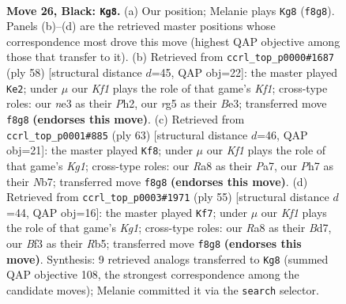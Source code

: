 \documentclass[11pt]{article}
\begin{document}
\clearpage

\begin{figure}[p]\centering
\begin{subfigure}{0.46\textwidth}\centering
\resizebox{\linewidth}{!}{%
\newchessgame
\chessboard[
  setfen={rn3k2/p4ppp/4p3/6R1/1P5P/4Nb2/P7/R1K5 b - - 0 26},
  showmover=false,
  pgfstyle=straightmove, color=movearrow, markmove={f8-g8}
]}
\caption{}
\end{subfigure}\hfill
\begin{subfigure}{0.46\textwidth}\centering
\resizebox{\linewidth}{!}{%
\newchessgame
\chessboard[
  setfen={1r4k1/5p2/7p/3p2pn/8/4B3/RP3PPP/5K2 w - - 0 30},
  showmover=false,
  pgfstyle=straightmove, color=movearrow, markmove={f1-e2}
]}
\caption{}
\end{subfigure}
\\[4pt]
\begin{subfigure}{0.46\textwidth}\centering
\resizebox{\linewidth}{!}{%
\newchessgame
\chessboard[
  setfen={6k1/pnr2pp1/1p5p/3RN3/P5PP/4P3/5PK1/8 b - - 2 32},
  showmover=false,
  pgfstyle=straightmove, color=movearrow, markmove={g8-f8}
]}
\caption{}
\end{subfigure}\hfill
\begin{subfigure}{0.46\textwidth}\centering
\resizebox{\linewidth}{!}{%
\newchessgame
\chessboard[
  setfen={6k1/p2b2pp/5p2/1r1p4/7P/P1B5/2P2PP1/2K1R3 b - - 0 28},
  showmover=false,
  pgfstyle=straightmove, color=movearrow, markmove={g8-f7}
]}
\caption{}
\end{subfigure}
\caption{\textbf{Move 26, Black: \texttt{Kg8}.} (a) Our position; Melanie plays \texttt{Kg8} (\texttt{f8g8}). Panels (b)--(d) are the retrieved master positions whose correspondence most drove this move (highest QAP objective among those that transfer to it). (b) Retrieved from \texttt{ccrl\_top\_p0000\#1687} (ply 58) [structural distance $d$=45, QAP obj=22]: the master played \texttt{Ke2}; under $\mu$ our \emph{Kf1} plays the role of that game's \emph{Kf1}; cross-type roles: our \emph{n}e3 as their \emph{P}h2, our \emph{r}g5 as their \emph{B}e3; transferred move \texttt{f8g8} \textbf{(endorses this move)}. (c) Retrieved from \texttt{ccrl\_top\_p0001\#885} (ply 63) [structural distance $d$=46, QAP obj=21]: the master played \texttt{Kf8}; under $\mu$ our \emph{Kf1} plays the role of that game's \emph{Kg1}; cross-type roles: our \emph{R}a8 as their \emph{P}a7, our \emph{P}h7 as their \emph{N}b7; transferred move \texttt{f8g8} \textbf{(endorses this move)}. (d) Retrieved from \texttt{ccrl\_top\_p0003\#1971} (ply 55) [structural distance $d$=44, QAP obj=16]: the master played \texttt{Kf7}; under $\mu$ our \emph{Kf1} plays the role of that game's \emph{Kg1}; cross-type roles: our \emph{R}a8 as their \emph{B}d7, our \emph{B}f3 as their \emph{R}b5; transferred move \texttt{f8g8} \textbf{(endorses this move)}. Synthesis: 9 retrieved analogs transferred to \texttt{Kg8} (summed QAP objective 108, the strongest correspondence among the candidate moves); Melanie committed it via the \texttt{search} selector.}
\label{fig:thought-m51}
\end{figure}
\end{document}
